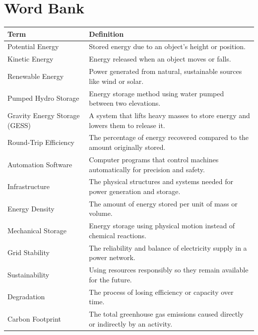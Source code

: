 \documentclass{article}
\begin{document}
\section*{Word Bank}
\begin{table}[ht!]
    \renewcommand{\arraystretch}{2}
    \centering
    \begin{tabularx}{\textwidth}{|l|X|}
        \hline
        \textbf{Term} & \textbf{Definition} \\
        \hline
        Potential Energy & Stored energy due to an object’s height or position. \\
        \hline
        Kinetic Energy & Energy released when an object moves or falls. \\
        \hline
        Renewable Energy & Power generated from natural, sustainable sources like wind or solar. \\
        \hline
        Pumped Hydro Storage & Energy storage method using water pumped between two elevations. \\
        \hline
        Gravity Energy Storage (GESS) & A system that lifts heavy masses to store energy and lowers them to release it. \\
        \hline
        Round-Trip Efficiency & The percentage of energy recovered compared to the amount originally stored. \\
        \hline
        Automation Software & Computer programs that control machines automatically for precision and safety. \\
        \hline
        Infrastructure & The physical structures and systems needed for power generation and storage. \\
        \hline
        Energy Density & The amount of energy stored per unit of mass or volume. \\
        \hline
        Mechanical Storage & Energy storage using physical motion instead of chemical reactions. \\
        \hline
        Grid Stability & The reliability and balance of electricity supply in a power network. \\
        \hline
        Sustainability & Using resources responsibly so they remain available for the future. \\
        \hline
        Degradation & The process of losing efficiency or capacity over time. \\
        \hline
        Carbon Footprint & The total greenhouse gas emissions caused directly or indirectly by an activity. \\

\end{tabularx}
\end{table}
\end{document}
